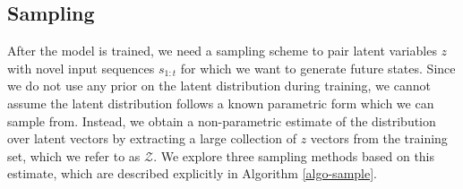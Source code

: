 \documentclass{article}
\begin{document}

\subsection{Sampling}

After the model is trained, we need a sampling scheme to pair latent variables $z$ with novel input sequences $s_{1:t}$ for which we want to generate future states.
Since we do not use any prior on the latent distribution during training, we cannot assume the latent distribution follows a known parametric form which we can sample from.
Instead, we obtain a non-parametric estimate of the distribution over latent vectors by extracting a large collection of $z$ vectors from the training set, which we refer to as $\mathcal{Z}$.
We explore three sampling methods based on this estimate, which are described explicitly in Algorithm \ref{algo-sample}.

\end{document}
